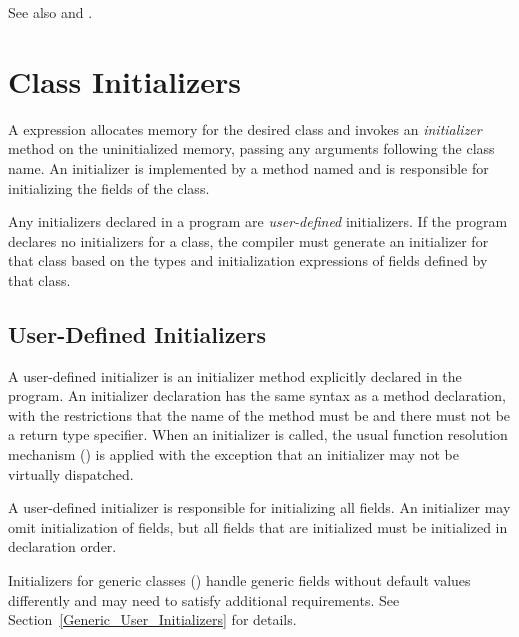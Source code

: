 See also  and .

\section{Class Initializers}
\label{Class_Initializers}

A  expression allocates memory for the desired class and invokes
an {\em initializer} method on the uninitialized memory, passing any arguments
following the class name. An initializer is implemented by a method named
 and is responsible for initializing the fields of the class.

Any initializers declared in a program are \emph{user-defined} initializers. If
the program declares no initializers for a class, the compiler must generate an
initializer for that class based on the types and initialization expressions of
fields defined by that class.

\subsection{User-Defined Initializers}
\label{User_Defined_Initializers}

A user-defined initializer is an initializer method explicitly declared in the
program.  An initializer declaration has the same syntax as a method
declaration, with the restrictions that the name of the method must be
 and there must not be a return type specifier. When an initializer
is called, the usual function resolution mechanism ()
is applied with the exception that an initializer may not be virtually
dispatched.

A user-defined initializer is responsible for initializing all fields. An
initializer may omit initialization of fields, but all fields that are
initialized must be initialized in declaration order.

Initializers for generic classes () handle generic fields
without default values differently and may need to satisfy additional
requirements.  See Section~\ref{Generic_User_Initializers} for details.

